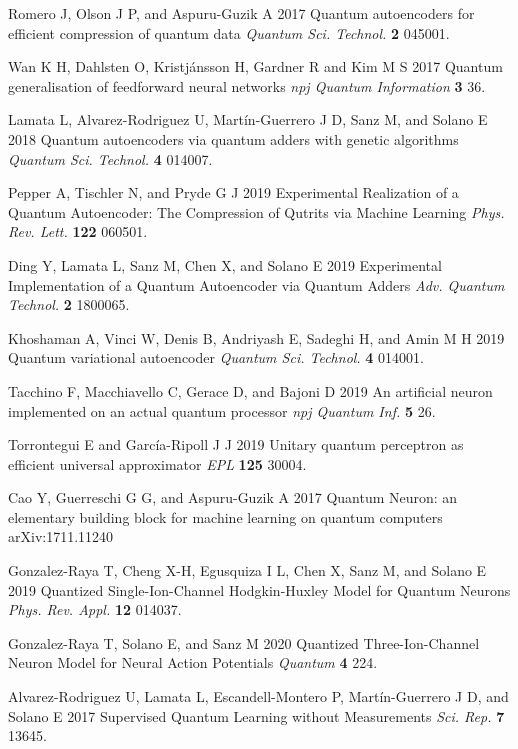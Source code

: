 \documentclass[12pt]{iopart}
\begin{document}
\begin{thebibliography}{999}
Romero J, Olson J P, and Aspuru-Guzik A 2017 Quantum autoencoders for efficient compression of quantum data {\it Quantum Sci. Technol.} {\bf 2} 045001.

 Wan K H, Dahlsten O, Kristj\'ansson H, Gardner R and Kim M S 2017 Quantum generalisation of feedforward neural networks {\it npj Quantum Information} {\bf 3} 36.

 Lamata L, Alvarez-Rodriguez U, Mart\'in-Guerrero J D, Sanz M, and Solano E 2018 Quantum autoencoders via quantum adders with genetic algorithms {\it Quantum Sci. Technol.} {\bf 4} 014007.

 Pepper A, Tischler N, and Pryde G J 2019 Experimental Realization of a Quantum Autoencoder: The Compression of Qutrits via Machine Learning {\it Phys. Rev. Lett.} {\bf 122} 060501. 

 Ding Y, Lamata L, Sanz M, Chen X, and Solano E 2019
  Experimental Implementation of a Quantum Autoencoder via Quantum Adders {\it Adv. Quantum Technol.} {\bf 2} 1800065.

 Khoshaman A, Vinci W, Denis B, Andriyash E, Sadeghi H, and Amin M H 2019 Quantum variational autoencoder {\it Quantum Sci. Technol.} {\bf 4} 014001.

 Tacchino F, Macchiavello C, Gerace D, and Bajoni D 
2019 An artificial neuron implemented on an actual quantum processor {\it npj Quantum Inf.} {\bf 5} 26. 

 Torrontegui E and García-Ripoll J J 2019 Unitary quantum perceptron as efficient universal approximator {\it EPL} {\bf 125} 30004.

 Cao Y, Guerreschi G G, and Aspuru-Guzik A 2017 Quantum Neuron: an elementary building block for machine learning on quantum computers arXiv:1711.11240

 Gonzalez-Raya T, Cheng X-H, Egusquiza I L, Chen X, Sanz M, and Solano E 2019 Quantized Single-Ion-Channel Hodgkin-Huxley Model for Quantum Neurons {\it Phys. Rev. Appl.} {\bf 12} 014037. 

  Gonzalez-Raya T, Solano E, and Sanz M 2020 Quantized Three-Ion-Channel Neuron Model for Neural Action Potentials {\it Quantum} {\bf 4} 224.

 Alvarez-Rodriguez U, Lamata L, Escandell-Montero P, Mart\'in-Guerrero J D, and Solano E 2017 Supervised Quantum Learning without Measurements {\it Sci. Rep.} {\bf 7} 13645.


\end{thebibliography}
\end{document}
